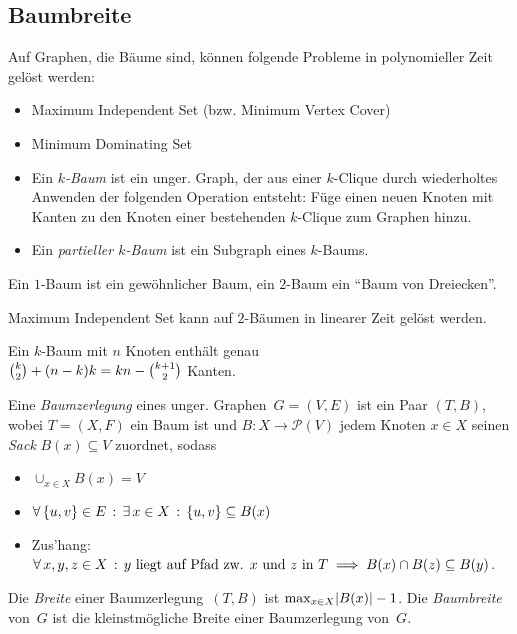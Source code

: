 \documentclass{cheat-sheet}
\newcommand{\size}[1]{\abs{#1}} %
\newcommand{\Powerset}{\mathcal{P}} %
\begin{document}
\subsection{Baumbreite}

\begin{bem}
  Auf Graphen, die Bäume sind, können folgende Probleme in polynomieller Zeit gelöst werden:
  \begin{itemize}
    \item Maximum Independent Set (bzw. Minimum Vertex Cover)
    \item Minimum Dominating Set
  \end{itemize}
\end{bem}

\begin{defn}
  \begin{itemize}
    \item
      Ein \emph{$k$-Baum} ist ein unger. Graph, der aus einer $k$-Clique durch wiederholtes Anwenden der folgenden Operation entsteht:
      Füge einen neuen Knoten mit Kanten zu den Knoten einer bestehenden $k$-Clique zum Graphen hinzu.
    \item Ein \emph{partieller $k$-Baum} ist ein Subgraph eines $k$-Baums.
  \end{itemize}
\end{defn}

\begin{bspe}
  Ein $1$-Baum ist ein gewöhnlicher Baum, ein $2$-Baum ein "`Baum von Dreiecken"'.
\end{bspe}

\begin{lem}
  Maximum Independent Set kann auf $2$-Bäumen in linearer Zeit gelöst werden.
\end{lem}

\begin{lem}
  \begin{minipage}[t]{0.8 \linewidth}
    Ein $k$-Baum mit $n$ Knoten enthält genau \\
    $\tbinom{k}{2} + (n-k) k = k n - \tbinom{k+1}{2}$ Kanten.
  \end{minipage}
\end{lem}

\begin{defn}
  Eine \emph{Baumzerlegung} eines unger. Graphen~$G = (V, E)$ ist ein Paar $(T, B)$, wobei $T = (X, F)$ ein Baum ist und $B : X \to \Powerset(V)$ jedem Knoten $x \in X$ seinen \textit{Sack} $B(x) \subseteq V$ zuordnet, sodass
  \begin{itemize}
    \item $\cup_{x \in X} B(x) = V$
    \item $\forall \, {\{ u, v \} \in E} \,:\, \exists \, {x \in X} \,:\, \{ u, v \} \subseteq B(x)$
    \item Zus'hang: $\forall \, {x, y, z \in X} \,:\, \text{$y$ liegt auf Pfad zw. $x$ und~$z$ in~$T$} \implies B(x) \cap B(z) \subseteq B(y)$.
  \end{itemize}
  Die \emph{Breite} einer Baumzerlegung~$(T, B)$ ist $\max_{x \in X} \size{B(x)} - 1$.
  Die \emph{Baumbreite} von~$G$ ist die kleinstmögliche Breite einer Baumzerlegung von~$G$.
\end{defn}
\end{document}
